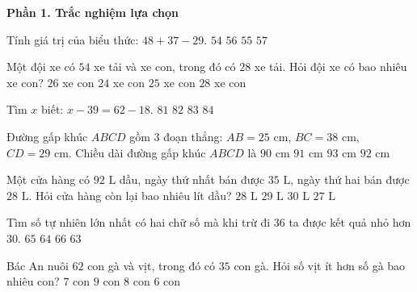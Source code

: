 \textbf{Phần 1. Trắc nghiệm lựa chọn}

\begin{ex} %
Tính giá trị của biểu thức: $48 + 37 - 29$.
\choice
{$54$}
{\True $56$}
{$55$}
{$57$}
\end{ex}

\begin{ex} %
Một đội xe có $54$ xe tải và xe con, trong đó có $28$ xe tải. Hỏi đội xe có bao nhiêu xe con?
\choice
{\True $26$ xe con}
{$24$ xe con}
{$25$ xe con}
{$28$ xe con}
\end{ex}

\begin{ex} %
Tìm $x$ biết: $x - 39 = 62 - 18$.
\choice
{$81$}
{$82$}
{\True $83$}
{$84$}
\end{ex}

\begin{ex} %
Đường gấp khúc $ABCD$ gồm $3$ đoạn thẳng: $AB = 25\text{ cm}$, $BC = 38\text{ cm}$, $CD = 29\text{ cm}$. Chiều dài đường gấp khúc $ABCD$ là
\choice
{$90\text{ cm}$}
{$91\text{ cm}$}
{$93\text{ cm}$}
{\True $92\text{ cm}$}
\end{ex}

\begin{ex} %
Một cửa hàng có $92\text{ L}$ dầu, ngày thứ nhất bán được $35\text{ L}$, ngày thứ hai bán được $28\text{ L}$. Hỏi cửa hàng còn lại bao nhiêu lít dầu?
\choice
{$28\text{ L}$}
{\True $29\text{ L}$}
{$30\text{ L}$}
{$27\text{ L}$}
\end{ex}

\begin{ex} %
Tìm số tự nhiên lớn nhất có hai chữ số mà khi trừ đi $36$ ta được kết quả nhỏ hơn $30$.
\choice
{\True $65$}
{$64$}
{$66$}
{$63$}
\end{ex}

\begin{ex} %
Bác An nuôi $62$ con gà và vịt, trong đó có $35$ con gà. Hỏi số vịt ít hơn số gà bao nhiêu con?
\choice
{$7$ con}
{$9$ con}
{\True $8$ con}
{$6$ con}
\end{ex}

